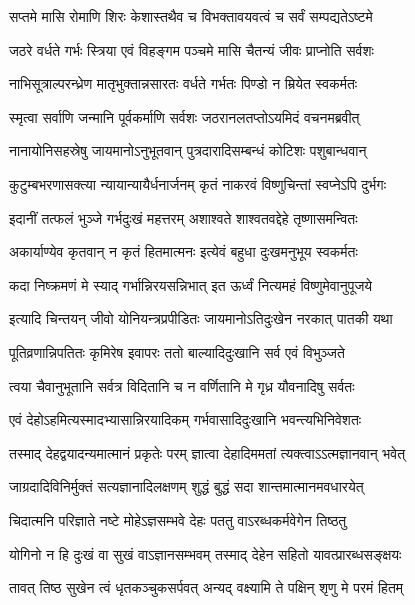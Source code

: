 \twolineshloka
{सप्तमे मासि रोमाणि शिरः केशास्तथैव च}
{विभक्तावयवत्वं च सर्वं सम्पद्यतेऽष्टमे} %

\twolineshloka
{जठरे वर्धते गर्भः स्त्रिया एवं विहङ्गम}
{पञ्चमे मासि चैतन्यं जीवः प्राप्नोति सर्वशः} %

\twolineshloka
{नाभिसूत्राल्परन्ध्रेण मातृभुक्तान्नसारतः}
{वर्धते गर्भतः पिण्डो न म्रियेत स्वकर्मतः} %

\twolineshloka
{स्मृत्वा सर्वाणि जन्मानि पूर्वकर्माणि सर्वशः}
{जठरानलतप्तोऽयमिदं वचनमब्रवीत्} %

\twolineshloka
{नानायोनिसहस्रेषु जायमानोऽनुभूतवान्}
{पुत्रदारादिसम्बन्धं कोटिशः पशुबान्धवान्} %

\twolineshloka
{कुटुम्बभरणासक्त्या न्यायान्यायैर्धनार्जनम्}
{कृतं नाकरवं विष्णुचिन्तां स्वप्नेऽपि दुर्भगः} %

\twolineshloka
{इदानीं तत्फलं भुञ्जे गर्भदुःखं महत्तरम्}
{अशाश्वते शाश्वतवद्देहे तृष्णासमन्वितः} %

\twolineshloka
{अकार्याण्येव कृतवान् न कृतं हितमात्मनः}
{इत्येवं बहुधा दुःखमनुभूय स्वकर्मतः} %

\twolineshloka
{कदा निष्क्रमणं मे स्याद् गर्भान्निरयसन्निभात्}
{इत ऊर्ध्वं नित्यमहं विष्णुमेवानुपूजये} %

\twolineshloka
{इत्यादि चिन्तयन् जीवो योनियन्त्रप्रपीडितः}
{जायमानोऽतिदुःखेन नरकात् पातकी यथा} %

\twolineshloka
{पूतिव्रणान्निपतितः कृमिरेष इवापरः}
{ततो बाल्यादिदुःखानि सर्व एवं विभुञ्जते} %

\twolineshloka
{त्वया चैवानुभूतानि सर्वत्र विदितानि च}
{न वर्णितानि मे गृध्र यौवनादिषु सर्वतः} %

\twolineshloka
{एवं देहोऽहमित्यस्मादभ्यासान्निरयादिकम्}
{गर्भवासादिदुःखानि भवन्त्यभिनिवेशतः} %

\twolineshloka
{तस्माद् देहद्वयादन्यमात्मानं प्रकृतेः परम्}
{ज्ञात्वा देहादिममतां त्यक्त्वाऽऽत्मज्ञानवान् भवेत्} %

\twolineshloka
{जाग्रदादिविनिर्मुक्तं सत्यज्ञानादिलक्षणम्}
{शुद्धं बुद्धं सदा शान्तमात्मानमवधारयेत्} %

\twolineshloka
{चिदात्मनि परिज्ञाते नष्टे मोहेऽज्ञसम्भवे}
{देहः पततु वाऽरब्धकर्मवेगेन तिष्ठतु} %

\twolineshloka
{योगिनो न हि दुःखं वा सुखं वाऽज्ञानसम्भवम्}
{तस्माद् देहेन सहितो यावत्प्रारब्धसङ्क्षयः} %

\twolineshloka
{तावत् तिष्ठ सुखेन त्वं धृतकञ्चुकसर्पवत्}
{अन्यद् वक्ष्यामि ते पक्षिन् शृणु मे परमं हितम्} %

